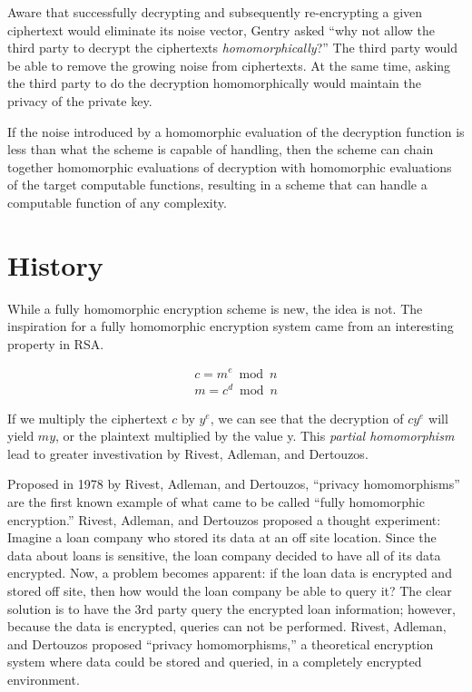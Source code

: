 \documentclass[a4paper,10pt]{article}
\begin{document}
Aware that successfully decrypting and subsequently re-encrypting a
given ciphertext would eliminate its noise vector, Gentry asked ``why
not allow the third party to decrypt the ciphertexts \textit{homomorphically}?''
The third party would be able to remove the growing noise from
ciphertexts. At the same time, asking the third party to do the
decryption homomorphically would maintain the privacy of the private
key.

If the noise introduced by a homomorphic evaluation of the decryption
function is less than what the scheme is capable of handling, then the
scheme can chain together homomorphic evaluations of decryption with
homomorphic evaluations of the target computable functions, resulting
in a scheme that can handle a computable function of any complexity.

\section{History}
While a fully homomorphic encryption scheme is new, the idea is
not. The inspiration for a fully homomorphic encryption system came
from an interesting property in RSA.

\begin{eqnarray*}
c = m ^{e} \bmod n\\
m = c ^{d} \bmod n 
\end{eqnarray*}

If we multiply the ciphertext $c$ by $y ^{e}$, we can see that the
decryption of $ cy^{e} $ will yield $my$, or the plaintext multiplied
by the value y. This \textit{partial homomorphism} lead to greater
investivation by Rivest, Adleman, and Dertouzos.

Proposed in 1978 by Rivest, Adleman, and Dertouzos, ``privacy
homomorphisms'' are the first known example of what came to be called
``fully homomorphic encryption.'' Rivest, Adleman, and Dertouzos
proposed a thought experiment: Imagine a loan company who stored its
data at an off site location. Since the data about loans is sensitive,
the loan company decided to have all of its data encrypted. Now, a
problem becomes apparent: if the loan data is encrypted and stored off
site, then how would the loan company be able to query it? The clear
solution is to have the 3rd party query the encrypted loan
information; however, because the data is encrypted, queries can not
be performed. Rivest, Adleman, and Dertouzos proposed ``privacy
homomorphisms,'' a theoretical encryption system where data could be
stored and queried, in a completely encrypted environment.
\end{document}
